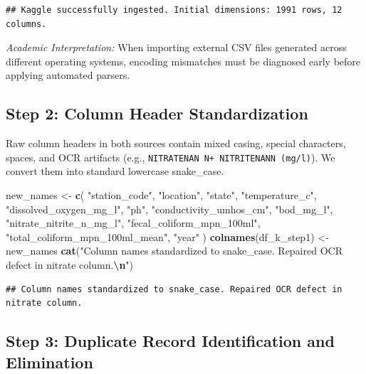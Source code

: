 \documentclass[
]{article}
\newenvironment{Shaded}{\begin{snugshade}}{\end{snugshade}}
\newcommand{\FunctionTok}[1]{\textcolor[rgb]{0.13,0.29,0.53}{\textbf{#1}}}
\newcommand{\NormalTok}[1]{#1}
\newcommand{\OtherTok}[1]{\textcolor[rgb]{0.56,0.35,0.01}{#1}}
\newcommand{\SpecialCharTok}[1]{\textcolor[rgb]{0.81,0.36,0.00}{\textbf{#1}}}
\newcommand{\StringTok}[1]{\textcolor[rgb]{0.31,0.60,0.02}{#1}}
\begin{document}
\begin{verbatim}
## Kaggle successfully ingested. Initial dimensions: 1991 rows, 12 columns.
\end{verbatim}

\emph{Academic Interpretation:} When importing external CSV files
generated across different operating systems, encoding mismatches must
be diagnosed early before applying automated parsers.

\subsection{Step 2: Column Header
Standardization}\label{step-2-column-header-standardization}

Raw column headers in both sources contain mixed casing, special
characters, spaces, and OCR artifacts (e.g.,
\texttt{NITRATENAN\ N+\ NITRITENANN\ (mg/l)}). We convert them into
standard lowercase snake\_case.

\begin{Shaded}
\begin{Highlighting}[]
\NormalTok{new\_names }\OtherTok{\textless{}{-}} \FunctionTok{c}\NormalTok{(}
  \StringTok{"station\_code"}\NormalTok{, }\StringTok{"location"}\NormalTok{, }\StringTok{"state"}\NormalTok{, }\StringTok{"temperature\_c"}\NormalTok{,}
  \StringTok{"dissolved\_oxygen\_mg\_l"}\NormalTok{, }\StringTok{"ph"}\NormalTok{, }\StringTok{"conductivity\_umhos\_cm"}\NormalTok{,}
  \StringTok{"bod\_mg\_l"}\NormalTok{, }\StringTok{"nitrate\_nitrite\_n\_mg\_l"}\NormalTok{, }\StringTok{"fecal\_coliform\_mpn\_100ml"}\NormalTok{,}
  \StringTok{"total\_coliform\_mpn\_100ml\_mean"}\NormalTok{, }\StringTok{"year"}
\NormalTok{)}
\FunctionTok{colnames}\NormalTok{(df\_k\_step1) }\OtherTok{\textless{}{-}}\NormalTok{ new\_names}
\FunctionTok{cat}\NormalTok{(}\StringTok{"Column names standardized to snake\_case. Repaired OCR defect in nitrate column.}\SpecialCharTok{\textbackslash{}n}\StringTok{"}\NormalTok{)}
\end{Highlighting}
\end{Shaded}

\begin{verbatim}
## Column names standardized to snake_case. Repaired OCR defect in nitrate column.
\end{verbatim}

\subsection{Step 3: Duplicate Record Identification and
Elimination}\label{step-3-duplicate-record-identification-and-elimination}
\end{document}
